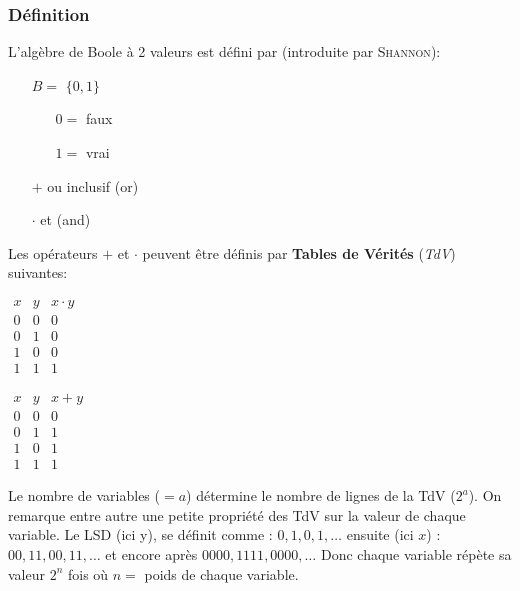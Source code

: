 \subsubsection{Définition}
L'algèbre de Boole à 2 valeurs est défini par (introduite par \textsc{Shannon}):
\begin{itemize}
	\item[$B=$]$\{0,1\}$
	\begin{itemize}
		\item[$0=$]faux
		\item[$1=$] vrai
	\end{itemize}
	\item[$+$]ou inclusif (or)
	\item[$\cdot$]et (and)
\end{itemize}
Les opérateurs $+$ et $\cdot$ peuvent être définis par \textbf{Tables de Vérités} (\textit{TdV}) suivantes:
\begin{table}[H]
	\begin{minipage}{0.5\textwidth}
		\centering
	$\begin{array}{c|c|c}
		x & y &  x\cdot y\\
		\hline
		0 & 0 & 0\\
		0 & 1 & 0\\
		1 & 0 & 0\\
		1 & 1 & 1
	\end{array}$
	\end{minipage}
	\begin{minipage}{0.5\textwidth}
		\centering
		$\begin{array}{c|c|c}
		x & y &  x+y\\
		\hline
		0 & 0 & 0\\
		0 & 1 & 1\\
		1 & 0 & 1\\
		1 & 1 & 1
		\end{array}$
	\end{minipage}
\end{table}
Le nombre de variables ($=a$) détermine le nombre de lignes de la TdV ($2^a$). On remarque entre autre une petite propriété des TdV sur la valeur de chaque variable. Le LSD (ici y), se définit comme : $0,1,0,1,\dots$ ensuite (ici $x$) : $00,11,00,11,\dots$ et encore après $0000,1111,0000,\dots$ Donc chaque variable répète sa valeur $2^n$ fois où $n=$ poids de chaque variable.
